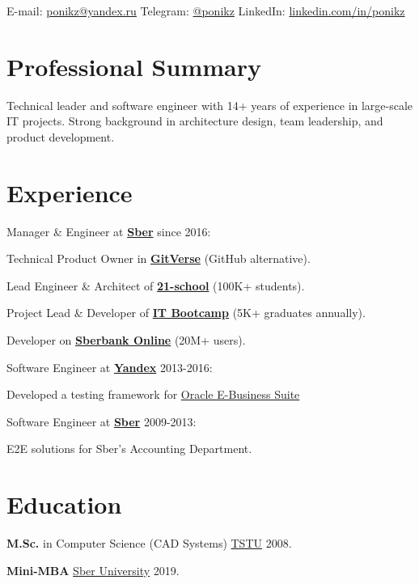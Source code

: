 \documentclass{aap}
\begin{document}
\sffamily

\myPhoto{}

{\scshape\bfseries\Large {}}\newline
E-mail: \href{mailto:ponikz@yandex.ru}{ponikz@yandex.ru}\newline
Telegram: \href{https://t.me/ponikz}{@ponikz}\newline
LinkedIn: \href{https://linkedin.com/in/ponikz/}{linkedin.com/in/ponikz}

\vspace{1em}

\section*{Professional Summary}
Technical leader and software engineer with 14+ years of experience in large-scale IT projects. Strong background in architecture design, team leadership, and product development.
\section*{Experience}
Manager \& Engineer at \textbf{\href{https:/sberbank.ru}{Sber}} since 2016:

\hspace{1em}Technical Product Owner in \textbf{\href{https://gitverse.ru}{GitVerse}} (GitHub alternative).

\hspace{1em}Lead Engineer \& Architect of \textbf{\href{https://21-school.ru/}{21-school}} 
 (100K+ students).

\hspace{1em}Project Lead \& Developer of \textbf{\href{https://developers.sber.ru/kak-v-sbere/bootcamp}{IT Bootcamp}} (5K+
graduates annually).

\hspace{1em}Developer on \textbf{\href{https://online.sberbank.ru}{Sberbank Online}} (20M+ users).

Software Engineer at \textbf{\href{https://www.ya.ru}{Yandex}} 2013-2016:

\hspace{1em}Developed a testing framework for \href{https://ru.wikipedia.org/wiki/Oracle_E-Business_Suite}{Oracle E-Business Suite}

Software Engineer at \textbf{\href{https:/sberbank.ru}{Sber}} 2009-2013:

\hspace{1em}E2E solutions for Sber's Accounting Department.

\section*{Education}
\textbf{M.Sc.} in Computer Science (CAD Systems) \href{https:/tstu.ru}{TSTU} 2008.

\textbf{Mini-MBA} \href{https://sberuniversity.ru/learning/program/mini-mba}{Sber University} 2019.
\end{document}
